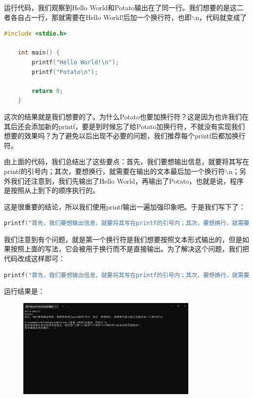 运行代码，我们观察到Hello World和Potato输出在了同一行。我们想要的是这二者各自占一行，那就需要在Hello World!后加一个换行符，也即$\backslash$n，代码就变成了

\begin{lstlisting}[language=C]
    #include <stdio.h>
    
    int main() {
        printf("Hello World!\n");
        printf("Potato\n");

        return 0;
    }
\end{lstlisting}

这次的结果就是我们想要的了。为什么Potato也要加换行符？这是因为也许我们在其后还会添加新的printf，要是到时候忘了给Potato加换行符，不就没有实现我们想要的效果吗？为了避免以后出现不必要的问题，我们推荐每个printf后都加换行符。

由上面的代码，我们总结出了这些要点：首先，我们要想输出信息，就要将其写在printf的引号内；其次，要想换行，就需要在输出的文本最后加一个换行符$\backslash$n；另外我们还注意到，我们先输出了Hello World，再输出了Potato，也就是说，程序是按照从上到下的顺序执行的。

这是很重要的结论，所以我们使用printf输出一遍加强印象吧。于是我们写下了：

\begin{lstlisting}[language=C]
    printf("首先，我们要想输出信息，就要将其写在printf的引号内；其次，要想换行，就需要在输出的文本最后加一个换行符\n；\n");
\end{lstlisting}

我们注意到有个问题，就是第一个换行符是我们想要按照文本形式输出的，但是如果按照上面的写法，它会被用于换行而不是直接输出。为了解决这个问题，我们把代码改成这样即可：

\begin{lstlisting}[language=C]
    printf("首先，我们要想输出信息，就要将其写在printf的引号内；其次，要想换行，就需要在输出的文本最后加一个换行符\\n；\n");
\end{lstlisting}

运行结果是：

\begin{figure}[H]
    \centering
    \includegraphics[width=0.8\textwidth, height=0.4\textheight]{images/1换行符输出.png}
\end{figure}

